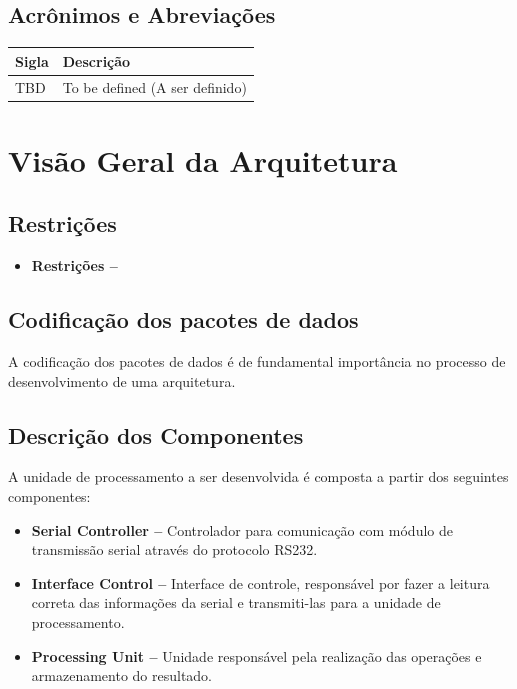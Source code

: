 \documentclass{report}
\begin{document}
  \section{Acrônimos e Abreviações}
    \FloatBarrier
    \begin{table}[H]
      \begin{center}
        \begin{tabular}[pos]{|m{2cm} | m{12cm}|} 
          \hline
          \cellcolor[gray]{0.9}\textbf{Sigla} & \cellcolor[gray]{0.9}\textbf{Descrição} \\ \hline
          TBD      &  To be defined (A ser definido)  \\ \hline
        \end{tabular}
      \end{center}
    \end{table}  

\chapter{Visão Geral da Arquitetura}

	\section{Restrições}
	\begin{itemize}
	\item \textbf{Restrições --} %
	\end{itemize}
	
	\section{Codificação dos pacotes de dados}
	A codificação dos pacotes de dados é de fundamental importância no processo de desenvolvimento
de uma arquitetura.

	\section{Descrição dos Componentes}
  A unidade de processamento a ser desenvolvida é composta a partir dos seguintes componentes:

  \begin{itemize}
    \item \textbf{Serial Controller --} Controlador para comunicação com módulo de transmissão serial através do protocolo RS232.
    \item \textbf{Interface Control --} Interface de controle, responsável por fazer a leitura correta das informações da serial e transmiti-las para a unidade de processamento.
    \item \textbf{Processing Unit --} Unidade responsável pela realização das operações e armazenamento do resultado.
  \end{itemize}
\end{document}
